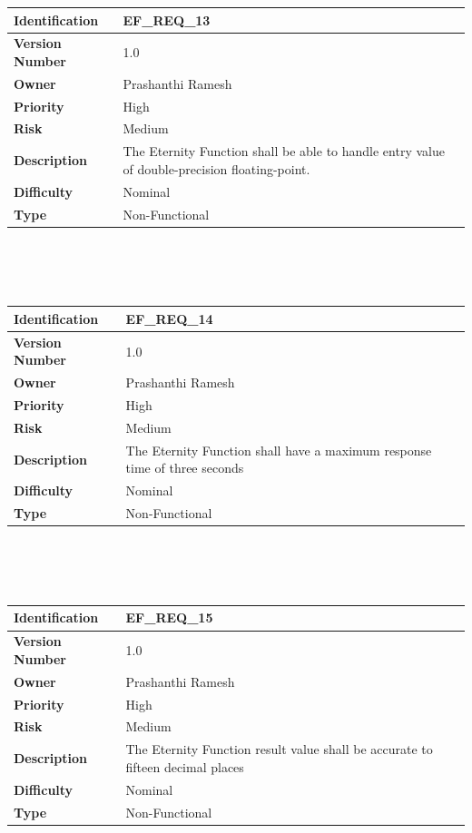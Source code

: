 \documentclass[11pt, english]{report}
\begin{document}
\setlength{\tabcolsep}{18pt}
\renewcommand{\arraystretch}{1.5}
\begin{tabular}{ |p{2.2cm}|p{9.8cm}| }
\hline
\textbf{Identification} &  EF\_REQ\_13 \\ \hline 
\textbf{Version Number} & 1.0 \\ \hline 
\textbf{Owner} & Prashanthi Ramesh  \\ \hline
\textbf{Priority} & High  \\ \hline
\textbf{Risk} & Medium  \\ \hline
\textbf{Description} & The Eternity Function shall be able to handle entry value of double-precision floating-point.\\ \hline
\textbf{Difficulty} & Nominal  \\ \hline
\textbf{Type} & Non-Functional \\ 
\hline
\end{tabular} \\ \\ \\ 

\setlength{\tabcolsep}{18pt}
\renewcommand{\arraystretch}{1.5}
\begin{tabular}{ |p{2.2cm}|p{9.8cm}| }
\hline
\textbf{Identification} &  EF\_REQ\_14 \\ \hline 
\textbf{Version Number} & 1.0 \\ \hline 
\textbf{Owner} & Prashanthi Ramesh  \\ \hline
\textbf{Priority} & High  \\ \hline
\textbf{Risk} & Medium  \\ \hline
\textbf{Description} & The Eternity Function shall have a maximum response time of three seconds\\ \hline
\textbf{Difficulty} & Nominal  \\ \hline
\textbf{Type} & Non-Functional \\ 
\hline
\end{tabular} \\ \\ \\ 

\setlength{\tabcolsep}{18pt}
\renewcommand{\arraystretch}{1.5}
\begin{tabular}{ |p{2.2cm}|p{9.8cm}| }
\hline
\textbf{Identification} &  EF\_REQ\_15 \\ \hline 
\textbf{Version Number} & 1.0 \\ \hline 
\textbf{Owner} & Prashanthi Ramesh  \\ \hline
\textbf{Priority} & High  \\ \hline
\textbf{Risk} & Medium  \\ \hline
\textbf{Description} & The Eternity Function result value shall be accurate to fifteen decimal places\\ \hline
\textbf{Difficulty} & Nominal  \\ \hline
\textbf{Type} & Non-Functional \\ 
\hline
\end{tabular} \\ \\ \\ 
\end{document}
